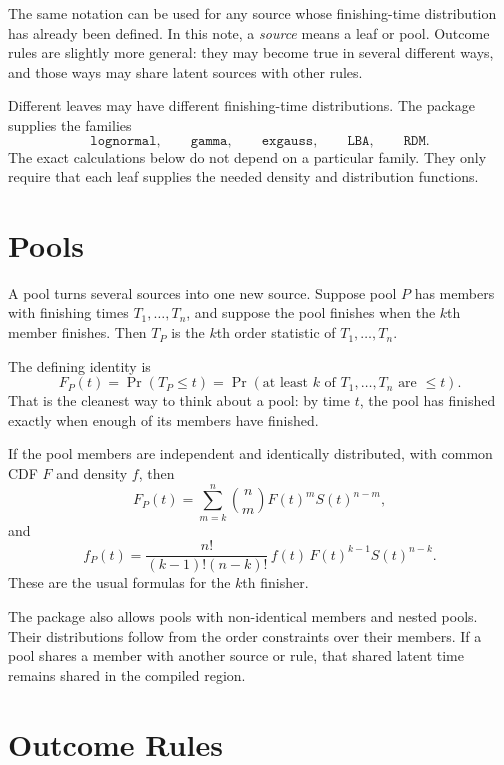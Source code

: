 \documentclass[11pt]{article}
\begin{document}
The same notation can be used for any source whose finishing-time distribution
has already been defined. In this note, a \emph{source} means a leaf or pool.
Outcome rules are slightly more general: they may become true in several
different ways, and those ways may share latent sources with other rules.

Different leaves may have different finishing-time distributions. The package
supplies the families
\[
\texttt{lognormal}, \qquad \texttt{gamma}, \qquad \texttt{exgauss}, \qquad
\texttt{LBA}, \qquad \texttt{RDM}.
\]
The exact calculations below do not depend on a particular family. They only
require that each leaf supplies the needed density and distribution functions.

\section{Pools}

A pool turns several sources into one new source. Suppose pool $P$ has members
with finishing times $T_1,\dots,T_n$, and suppose the pool finishes when the
$k$th member finishes. Then $T_P$ is the $k$th order statistic of
$T_1,\dots,T_n$.

The defining identity is
\begin{equation}
F_P(t)
=
\Pr(T_P \le t)
=
\Pr(\text{at least $k$ of } T_1,\dots,T_n \text{ are } \le t).
\label{eq:pool-cdf}
\end{equation}
That is the cleanest way to think about a pool: by time $t$, the pool has
finished exactly when enough of its members have finished.

If the pool members are independent and identically distributed, with common
CDF $F$ and density $f$, then
\begin{equation}
F_P(t) = \sum_{m=k}^n \binom{n}{m} F(t)^m S(t)^{n-m},
\label{eq:pool-cdf-iid}
\end{equation}
and
\begin{equation}
f_P(t)
=
\frac{n!}{(k-1)!(n-k)!}\,
f(t)\,F(t)^{k-1}S(t)^{n-k}.
\label{eq:pool-density}
\end{equation}
These are the usual formulas for the $k$th finisher.

The package also allows pools with non-identical members and nested pools.
Their distributions follow from the order constraints over their members.
If a pool shares a member with another source or rule, that shared latent time
remains shared in the compiled region.

\section{Outcome Rules}
\end{document}
